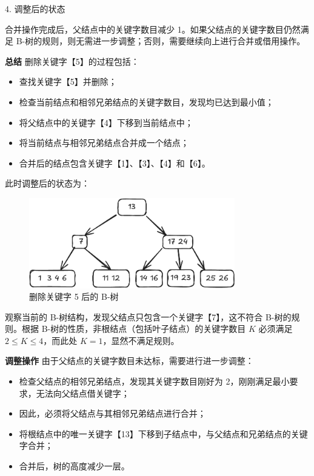 \documentclass[lang=cn,newtx,10pt,scheme=chinese]{../elegantbook}
\begin{document}
      4. 调整后的状态 

         合并操作完成后，父结点中的关键字数目减少 1。如果父结点的关键字数目仍然满足 B-树的规则，则无需进一步调整；否则，需要继续向上进行合并或借用操作。
      
      
      \textbf{总结}  
      删除关键字【5】的过程包括：
      \begin{itemize}
        \item 查找关键字【5】并删除；
        \item 检查当前结点和相邻兄弟结点的关键字数目，发现均已达到最小值；
        \item 将父结点中的关键字【4】下移到当前结点中；
        \item 将当前结点与相邻兄弟结点合并成一个结点；
        \item 合并后的结点包含关键字【1】、【3】、【4】和【6】。
      \end{itemize}

      此时调整后的状态为：
      \begin{figure}[h!]
          \centering
          \includegraphics[width=0.8\textwidth]{./figure/pdf/cropped/Btree_del5.pdf}
          \caption{删除关键字 5 后的 B-树}
          \label{fig:Btree_delete_5}

      \end{figure}

观察当前的 B-树结构，发现父结点只包含一个关键字【7】，这不符合 B-树的规则。根据 B-树的性质，非根结点（包括叶子结点）的关键字数目 $K$ 必须满足 $2 \leq K \leq 4$，而此处 $K = 1$，显然不满足规则。


\textbf{调整操作}  
由于父结点的关键字数目未达标，需要进行进一步调整：
\begin{itemize}
  \item 检查父结点的相邻兄弟结点，发现其关键字数目刚好为 2，刚刚满足最小要求，无法向父结点借关键字；
  \item 因此，必须将父结点与其相邻兄弟结点进行合并；
  \item 将根结点中的唯一关键字【13】下移到子结点中，与父结点和兄弟结点的关键字合并；
  \item 合并后，树的高度减少一层。
\end{itemize}
\end{document}
